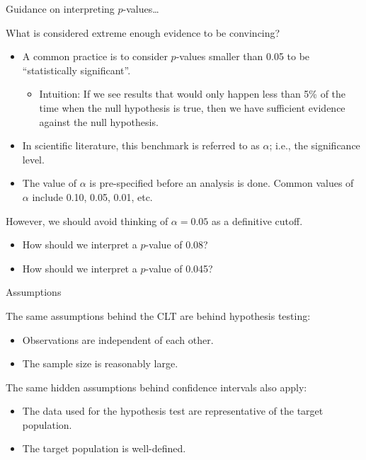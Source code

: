 \documentclass[
  ignorenonframetext,
  aspectratio=169]{beamer}
\providecommand{\tightlist}{%
  \setlength{\itemsep}{0pt}\setlength{\parskip}{0pt}}
\begin{document}
\begin{frame}{Guidance on interpreting \(p\)-values\ldots{}}
\protect\hypertarget{guidance-on-interpreting-p-values-1}{}
\small

What is considered extreme enough evidence to be convincing?

\begin{itemize}
\item
  A common practice is to consider \(p\)-values smaller than 0.05 to be
  ``statistically significant''.

  \begin{itemize}
  \tightlist
  \item
    Intuition: If we see results that would only happen less than 5\% of
    the time when the null hypothesis is true, then we have sufficient
    evidence against the null hypothesis.
  \end{itemize}
\item
  In scientific literature, this benchmark is referred to as \(\alpha\);
  i.e., the significance level.
\item
  The value of \(\alpha\) is pre-specified before an analysis is done.
  Common values of \(\alpha\) include 0.10, 0.05, 0.01, etc.
\end{itemize}

However, we should avoid thinking of \(\alpha = 0.05\) as a definitive
cutoff.

\begin{itemize}
\item
  How should we interpret a \(p\)-value of 0.08?
\item
  How should we interpret a \(p\)-value of 0.045?
\end{itemize}
\end{frame}

\begin{frame}{Assumptions}
\protect\hypertarget{assumptions}{}
\small

The same assumptions behind the CLT are behind hypothesis testing:

\begin{itemize}
\item
  Observations are independent of each other.
\item
  The sample size is reasonably large.
\end{itemize}

The same hidden assumptions behind confidence intervals also apply:

\begin{itemize}
\item
  The data used for the hypothesis test are representative of the target
  population.
\item
  The target population is well-defined.
\end{itemize}
\end{frame}
\end{document}
